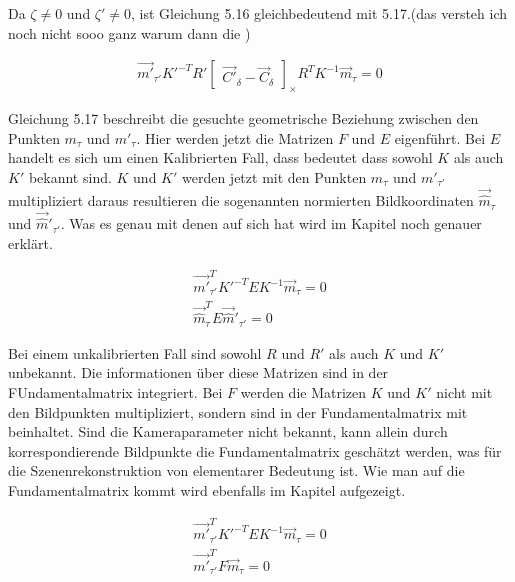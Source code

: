 Da $\zeta \neq 0$ und $\zeta' \neq 0$, ist Gleichung 5.16 gleichbedeutend mit 5.17.(das versteh ich noch nicht sooo ganz warum dann die )

\begin{gather}
\vec{m'}_{\tau'} K'^{-T}R' \begin{bmatrix}	\vec{C'}_\delta - \vec{C}_\delta\end{bmatrix}_\times R^TK^{-1}\vec{m}_\tau = 0
\end{gather}

Gleichung 5.17 beschreibt die gesuchte geometrische Beziehung zwischen den Punkten $m_\tau$ und $m'_{\tau}$. Hier werden jetzt die Matrizen $F$ und $E$ eigenführt. Bei $E$ handelt es sich um einen Kalibrierten Fall, dass bedeutet dass sowohl $K$ als auch $K'$ bekannt sind. $K$ und $K'$ werden jetzt mit den Punkten $m_\tau$ und $m'_{\tau'}$ multipliziert daraus resultieren die sogenannten normierten Bildkoordinaten $\vec{\hat{m}}_\tau$ und $\vec{\hat{m}}'_{\tau'}$. Was es genau mit denen auf sich hat wird im Kapitel  noch genauer erklärt\cite{Elements}. 

%

\begin{gather}
\vec{m'}_{\tau'}^T K'^{-T}EK^{-1}\vec{m}_\tau = 0\\
\vec{\hat{m}}_\tau^T E \vec{\hat{m}}'_{\tau'} = 0
\end{gather}

Bei einem unkalibrierten Fall sind sowohl $R$ und $R'$ als auch $K$ und $K'$ unbekannt. Die informationen über diese Matrizen sind in der FUndamentalmatrix integriert. Bei $F$ werden die Matrizen $K$ und $K'$ nicht mit den Bildpunkten multipliziert, sondern sind in der Fundamentalmatrix mit beinhaltet\cite{Elements}. Sind die Kameraparameter nicht bekannt, kann allein durch korrespondierende Bildpunkte die Fundamentalmatrix geschätzt werden, was für die Szenenrekonstruktion von elementarer Bedeutung ist\cite{HZ,Zhang2014,ComputerVision,Elements,Ferid}. Wie man auf die Fundamentalmatrix kommt wird ebenfalls im Kapitel  aufgezeigt.

\begin{gather}
\vec{m'}_{\tau'}^T K'^{-T}EK^{-1}\vec{m}_\tau = 0\\
\vec{m'}_{\tau'}^T F\vec{m}_\tau = 0
\end{gather}



